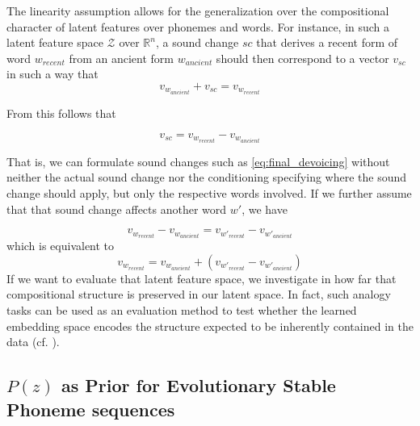 \documentclass[6pt]{article}
\begin{document}

The linearity assumption allows for the generalization over the compositional character of latent features over phonemes and words. For instance, in such a latent feature space $\mathcal{Z}$ over $\mathbb{R}^n$, a sound change $sc$ that derives a recent form of word $w_{recent}$ from an ancient form  $w_{ancient}$ should then correspond to a vector $v_{sc}$ in such a way that 
\begin{equation}
\label{eq:sound_change_linear_dependency}
v_{w_{ancient}}+v_{sc} = v_{w_{recent}}
\end{equation}

From this follows that 

\begin{equation}
v_{sc} =  v_{w_{recent}} - v_{w_{ancient}} 
\end{equation}

That is, we can formulate sound changes such as \ref{eq:final_devoicing} without neither the actual sound change nor the conditioning specifying where the sound change should apply, but only the respective words involved.
If we further assume that that sound change affects another word $w'$, we have

\begin{equation}
v_{w_{recent}} - v_{w_{ancient}}  =  v_{w'_{recent}} - v_{w'_{ancient}} 
\end{equation}
which is equivalent to
\begin{equation}
v_{w_{recent}}  =   v_{w_{ancient}}  + (v_{w'_{recent}} - v_{w'_{ancient}}) 
\end{equation}
If we want to evaluate that latent feature space, we investigate in how far that compositional structure is preserved in our latent space. In fact, such analogy tasks can be used as an evaluation method to test whether the learned embedding space encodes the structure expected to be inherently contained in the data (cf. \cite{mikolov2013distributed}).

\subsection{$P(z)$ as Prior for Evolutionary Stable Phoneme sequences}
\end{document}
